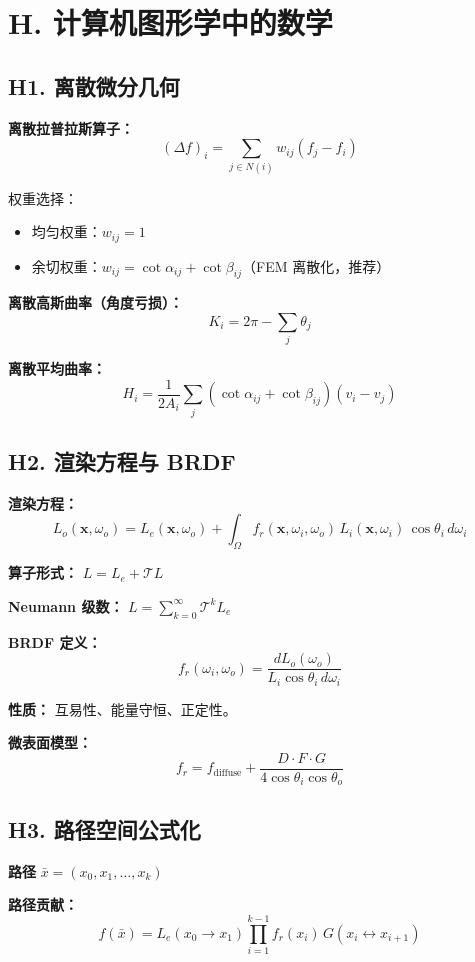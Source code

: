 \section{H. 计算机图形学中的数学}

\subsection{H1. 离散微分几何}

\textbf{离散拉普拉斯算子：}
\[
(\Delta f)_i = \sum_{j \in N(i)} w_{ij}(f_j - f_i)
\]

权重选择：
\begin{itemize}
  \item 均匀权重：$w_{ij} = 1$
  \item 余切权重：$w_{ij} = \cot\alpha_{ij} + \cot\beta_{ij}$（FEM 离散化，推荐）
\end{itemize}

\textbf{离散高斯曲率（角度亏损）：}
\[
K_i = 2\pi - \sum_{j} \theta_j
\]

\textbf{离散平均曲率：}
\[
H_i = \frac{1}{2A_i}\sum_{j} (\cot\alpha_{ij} + \cot\beta_{ij})(v_i - v_j)
\]

\subsection{H2. 渲染方程与 BRDF}

\textbf{渲染方程：}
\[
L_o(\mathbf{x}, \omega_o) = L_e(\mathbf{x}, \omega_o) + \int_{\Omega} f_r(\mathbf{x}, \omega_i, \omega_o)\, L_i(\mathbf{x}, \omega_i)\, \cos\theta_i\, d\omega_i
\]

\textbf{算子形式：} $L = L_e + \mathcal{T}L$

\textbf{Neumann 级数：} $L = \displaystyle\sum_{k=0}^{\infty} \mathcal{T}^k L_e$

\textbf{BRDF 定义：}
\[
f_r(\omega_i, \omega_o) = \frac{dL_o(\omega_o)}{L_i \cos\theta_i\, d\omega_i}
\]

\textbf{性质：} 互易性、能量守恒、正定性。

\textbf{微表面模型：}
\[
f_r = f_{\text{diffuse}} + \frac{D \cdot F \cdot G}{4\cos\theta_i \cos\theta_o}
\]

\subsection{H3. 路径空间公式化}

\textbf{路径} $\bar{x} = (x_0, x_1, \ldots, x_k)$

\textbf{路径贡献：}
\[
f(\bar{x}) = L_e(x_0 \to x_1) \prod_{i=1}^{k-1} f_r(x_i)\, G(x_i \leftrightarrow x_{i+1})
\]

